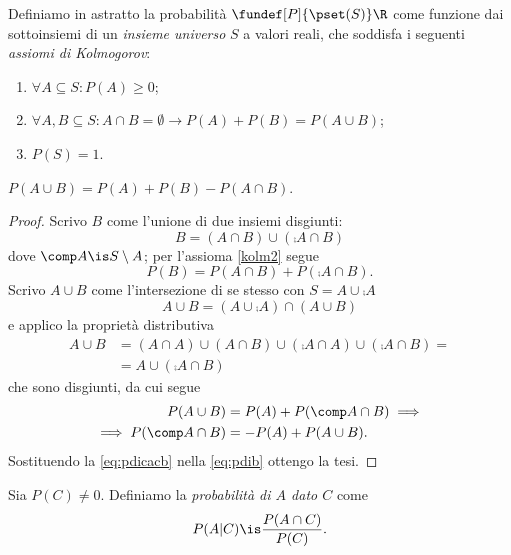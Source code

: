 

\begin{definition}[Probabilità]
	Definiamo in astratto la probabilità $\fundef[P]{\pset(S)}\R$ come funzione dai sottoinsiemi di un \emph{insieme universo} $S$ a valori reali, che soddisfa i seguenti \emph{assiomi di Kolmogorov}:
	\begin{enumerate}
		\item $\forall A\subseteq S:P(A) \ge 0$;
		\item $\forall A,B\subseteq S: A\cap B=\emptyset \rightarrow P(A)+P(B)=P(A\cup B)$; \label{kolm2}
		\item $P(S)=1$.
	\end{enumerate}
\end{definition}

\begin{theorem}
	$P(A\cup B) = P(A) + P(B) - P(A\cap B)$.
\end{theorem}

\begin{proof}
	Scrivo $B$ come l'unione di due insiemi disgiunti:
	\[B = (A\cap B) \cup (\comp A \cap B)\]
	dove $\comp A\is S\setminus A$; per l'assioma \ref{kolm2} segue
	\begin{equation}
		\label{eq:pdib}
		P(B) = P(A\cap B) + P(\comp A \cap B).
	\end{equation}
	Scrivo $A\cup B$ come l'intersezione di se stesso con $S=A\cup\comp A$
	\[A\cup B = (A\cup\comp A) \cap (A\cup B)\]
	e applico la proprietà distributiva
	\begin{align*}
		A\cup B
		&= (A\cap A) \cup (A\cap B) \cup (\comp A\cap A) \cup (\comp A \cap B) = \\
		&= A \cup (\comp A\cap B)
	\end{align*}
	che sono disgiunti, da cui segue
	\begin{align}
		P(A\cup B)
		&= P(A) + P(\comp A\cap B) \implies \notag \\
		\implies P(\comp A\cap B)
		&= -P(A) + P(A\cup B). \label{eq:pdicacb}
	\end{align}
	Sostituendo la \eqref{eq:pdicacb} nella \eqref{eq:pdib} ottengo la tesi.
\end{proof}

\begin{definition}
	Sia $P(C)\neq 0$. Definiamo la \emph{probabilità di $A$ dato $C$} come
	\[P(A|C) \is \frac{P(A\cap C)}{P(C)}.\]
\end{definition}

